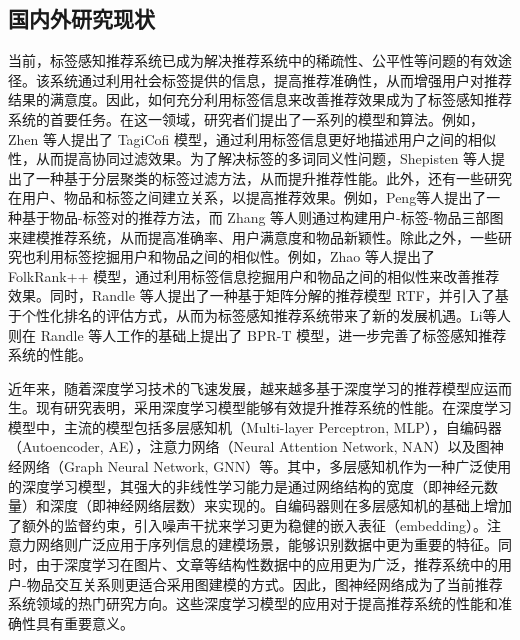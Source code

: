 \subsection{国内外研究现状}
当前，标签感知推荐系统已成为解决推荐系统中的稀疏性、公平性等问题的有效途径。该系统通过利用社会标签提供的信息，提高推荐准确性，从而增强用户对推荐结果的满意度。因此，如何充分利用标签信息来改善推荐效果成为了标签感知推荐系统的首要任务。在这一领域，研究者们提出了一系列的模型和算法。例如，Zhen 等人\cite{zhen_tagicofi_2009}提出了 TagiCofi 模型，通过利用标签信息更好地描述用户之间的相似性，从而提高协同过滤效果。为了解决标签的多词同义性问题，Shepisten 等人\cite{shepitsen_personalized_2008}提出了一种基于分层聚类的标签过滤方法，从而提升推荐性能。此外，还有一些研究在用户、物品和标签之间建立关系，以提高推荐效果。例如，Peng等人\cite{peng_collaborative_2010}提出了一种基于物品-标签对的推荐方法，而 Zhang 等人\cite{zhang_personalized_2010, zhang_solving_2012}则通过构建用户-标签-物品三部图来建模推荐系统，从而提高准确率、用户满意度和物品新颖性。除此之外，一些研究也利用标签挖掘用户和物品之间的相似性。例如，Zhao 等人\cite{zhao_folkrank_2021}提出了 FolkRank++ 模型，通过利用标签信息挖掘用户和物品之间的相似性来改善推荐效果。同时，Randle 等人\cite{rendle_learning_2009}提出了一种基于矩阵分解的推荐模型 RTF，并引入了基于个性化排名的评估方式，从而为标签感知推荐系统带来了新的发展机遇。Li等人\cite{li_tag-aware_2019}则在 Randle 等人工作的基础上提出了 BPR-T 模型，进一步完善了标签感知推荐系统的性能。

近年来，随着深度学习技术的飞速发展，越来越多基于深度学习的推荐模型应运而生。现有研究表明，采用深度学习模型能够有效提升推荐系统的性能。在深度学习模型中，主流的模型包括多层感知机（Multi-layer Perceptron, MLP）\cite{he_neural_2017,zhang_deep_2016,qu_product-based_2018,shan_deep_2016}，自编码器（Autoencoder, AE）\cite{sedhain_autorec_2015, liang_variational_2018}，注意力网络（Neural Attention Network, NAN）\cite{he_nais_2018, chen_attentive_2017}以及图神经网络（Graph Neural Network, GNN）\cite{wang_neural_2019,he_lightgcn_2020}等。其中，多层感知机作为一种广泛使用的深度学习模型，其强大的非线性学习能力是通过网络结构的宽度（即神经元数量）和深度（即神经网络层数）来实现的。自编码器则在多层感知机的基础上增加了额外的监督约束，引入噪声干扰来学习更为稳健的嵌入表征（embedding）。注意力网络则广泛应用于序列信息的建模场景，能够识别数据中更为重要的特征。同时，由于深度学习在图片、文章等结构性数据中的应用更为广泛，推荐系统中的用户-物品交互关系则更适合采用图建模的方式。因此，图神经网络成为了当前推荐系统领域的热门研究方向。这些深度学习模型的应用对于提高推荐系统的性能和准确性具有重要意义。

